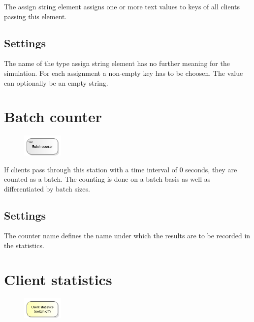 The assign string element assigns one or more text values to keys of all clients passing this element.

\subsection*{Settings}

The name of the type assign string element has no further meaning for the simulation.
For each assignment a non-empty key has to be choosen. The value can optionally be an empty string.


\section{Batch counter}
\label{ref:ModelElementCounterBatch}

\begin{figure}
\vspace{-22pt}
\includegraphics[width=2cm]{imageModelElementCounterBatch.png}
\vspace{-22pt}
\end{figure}

If clients pass through this station with a time interval of 0 seconds, they are counted as a batch.
The counting is done on a batch basis as well as differentiated by batch sizes.

\subsection*{Settings}

The counter name defines the name under which the results are to be recorded in the statistics.


\section{Client statistics}
\label{ref:ModelElementSetStatisticsMode}

\begin{figure}
\vspace{-22pt}
\includegraphics[width=2cm]{imageModelElementSetStatisticsMode.png}
\vspace{-22pt}
\end{figure}

